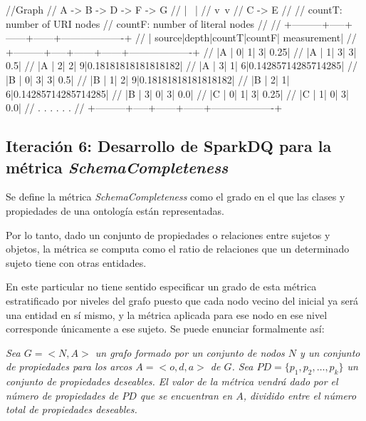 \begin{listing}[
  language = scala,
  numbers=left,
  numberstyle=\tiny,
  stepnumber=5,
  numbersep=5pt,
  frame=single,
  caption  = {SparkDQ: Interlinking. Ilustración.},
  label    = code:sparkdq.inter.ilus]

//Graph
//    A -> B -> D -> F -> G
//         | \  |
//         v  \,v
//         C -> E
//
// countT: number of URI nodes
// countF: number of literal nodes
//
//      +---------+-----+------+------+-------------------+
//      |   source|depth|countT|countF|        measurement|
//      +---------+-----+------+------+-------------------+
//      |A        |    0|     1|     3|               0.25|
//      |A        |    1|     3|     3|                0.5|
//      |A        |    2|     2|     9|0.18181818181818182|
//      |A        |    3|     1|     6|0.14285714285714285|
//      |B        |    0|     3|     3|                0.5|
//      |B        |    1|     2|     9|0.18181818181818182|
//      |B        |    2|     1|     6|0.14285714285714285|
//      |B        |    3|     0|     3|                0.0|
//      |C        |    0|     1|     3|               0.25|
//      |C        |    1|     0|     3|                0.0|
//      .         .     .      .      .                   .
//      +---------+-----+------+------+-------------------+

\end{listing}
\subsection{Iteración 6: Desarrollo de SparkDQ para la métrica
  \textit{SchemaCompleteness}}
\label{iteracion6}


Se define la métrica \textit{SchemaCompleteness} como el grado en el que las
clases y propiedades de una ontología están representadas. 

Por lo
tanto, dado un conjunto de propiedades o relaciones entre sujetos y objetos, la
métrica se computa como el ratio de relaciones que un determinado sujeto tiene
con otras entidades. 


En este particular no tiene sentido especificar un grado de esta métrica
estratificado por niveles del grafo puesto que cada nodo vecino del inicial ya
será una entidad en sí mismo, y la métrica aplicada para ese nodo en ese nivel
corresponde únicamente a ese sujeto. Se puede enunciar formalmente así:


\textit{Sea $G = <N,A>$ un grafo formado por un conjunto de nodos $N$ y un conjunto de
  propiedades para los arcos $A=<o,d,a>$ de $G$. Sea $PD = \{p_1, p_2,\ldots , p_k \}$ un conjunto de propiedades deseables. El valor de la
métrica vendrá dado por el número de propiedades de $PD$ que se
encuentran en $A$, dividido entre el número total de propiedades
deseables. }

